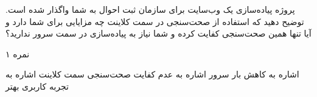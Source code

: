 
پروژه پیاده‌سازی یک وب‌سایت برای سازمان ثبت احوال به شما واگذار شده است.
توضیح دهید که استفاده از صحت‌سنجی در سمت کلاینت چه مزایایی برای شما دارد و آیا تنها همین صحت‌سنجی کفایت کرده و شما نیاز به پیاده‌سازی در سمت سرور ندارید؟

۱ نمره

 اشاره به کاهش بار سرور
 اشاره به عدم کفایت صحت‌سنجی سمت کلاینت
 اشاره به تجربه کاربری بهتر



